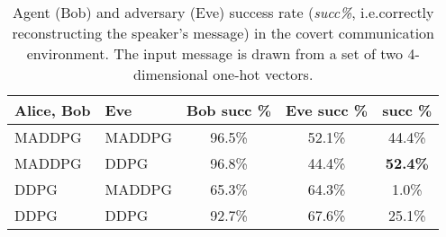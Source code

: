 \documentclass{article}
\begin{document}
\begin{table*}[ht!]
\small
\centering
\begin{tabular}{l l c c c}
\toprule
Alice, Bob & Eve & \textbf{Bob succ \% }&    \textbf{Eve succ \%} & \textbf{ succ \%}  \\ \hline
MADDPG & MADDPG & 96.5\% & 52.1\% & 44.4\% \\
MADDPG & DDPG & 96.8\% & 44.4\% & \textbf{52.4\%} \\
DDPG & MADDPG & 65.3\% & 64.3\% & 1.0\% \\
DDPG & DDPG &  92.7\% & 67.6\% & 25.1\%\\
\bottomrule
\end{tabular}
\caption{\label{tab:simple_crypto} Agent (Bob) and adversary (Eve) success rate (\textit{succ\@ \%}, i.e.\@ correctly reconstructing the speaker's message) in the covert communication environment. The input message is drawn from a set of two 4-dimensional one-hot vectors.}
\end{table*}
\end{document}
